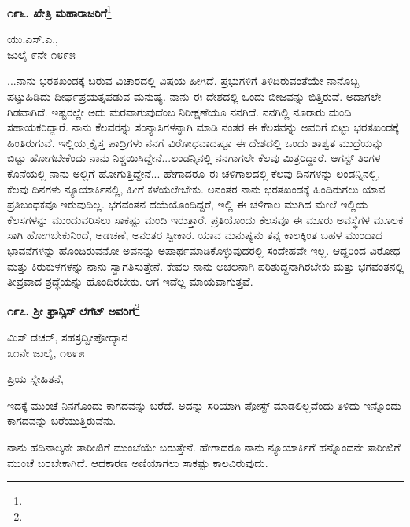\begin{center}
\textbf{೧೯೬. ಖೇತ್ರಿ ಮಹಾರಾಜರಿಗೆ}\footnote{}
\end{center}

\begin{flushright}
ಯು.ಎಸ್.ಎ.,\\ಜುಲೈ ೯ನೇ ೧೮೯೫
\end{flushright}

...ನಾನು ಭರತಖಂಡಕ್ಕೆ ಬರುವ ವಿಚಾರದಲ್ಲಿ ವಿಷಯ ಹೀಗಿದೆ. ಪ್ರಭುಗಳಿಗೆ ತಿಳಿದಿರುವಂತೆಯೇ ನಾನೊಬ್ಬ ಪಟ್ಟುಹಿಡಿದು ದೀರ್ಘಪ್ರಯತ್ನಪಡುವ ಮನುಷ್ಯ. ನಾನು ಈ ದೇಶದಲ್ಲಿ ಒಂದು ಬೀಜವನ್ನು ಬಿತ್ತಿರುವೆ. ಅದಾಗಲೇ ಗಿಡವಾಗಿದೆ. ಇಷ್ಟರಲ್ಲೇ ಅದು ಮರವಾಗುವುದೆಂಬ ನಿರೀಕ್ಷಣೆಯೂ ನನಗಿದೆ. ನನಗಿಲ್ಲಿ ನೂರಾರು ಮಂದಿ ಸಹಾಯಕರಿದ್ದಾರೆ. ನಾನು ಕೆಲವರನ್ನು ಸಂನ್ಯಾಸಿಗಳನ್ನಾಗಿ ಮಾಡಿ ನಂತರ ಈ ಕೆಲಸವನ್ನು ಅವರಿಗೆ ಬಿಟ್ಟು ಭರತಖಂಡಕ್ಕೆ ಹಿಂತಿರುಗುವೆ. ಇಲ್ಲಿಯ ಕ್ರೈಸ್ತ ಪಾದ್ರಿಗಳು ನನಗೆ ವಿರೋಧವಾದಷ್ಟೂ ಈ ದೇಶದಲ್ಲಿ ಒಂದು ಶಾಶ್ವತ ಮುದ್ರೆಯನ್ನು ಬಿಟ್ಟು ಹೋಗಬೇಕೆಂದು ನಾನು ನಿಶ್ಚಯಿಸಿದ್ದೇನೆ...ಲಂಡನ್ನಿನಲ್ಲಿ ನನಗಾಗಲೇ ಕೆಲವು ಮಿತ್ರರಿದ್ದಾರೆ. ಆಗಸ್ಟ್ ತಿಂಗಳ ಕೊನೆಯಲ್ಲಿ ನಾನು ಅಲ್ಲಿಗೆ ಹೋಗುತ್ತಿದ್ದೇನೆ... ಹೇಗಾದರೂ ಈ ಚಳಿಗಾಲದಲ್ಲಿ ಕೆಲವು ದಿನಗಳನ್ನು ಲಂಡನ್ನಿನಲ್ಲಿ, ಕೆಲವು ದಿನಗಳು ನ್ಯೂಯಾರ್ಕಿನಲ್ಲಿ, ಹೀಗೆ ಕಳೆಯಲೇಬೇಕು. ಅನಂತರ ನಾನು ಭರತಖಂಡಕ್ಕೆ ಹಿಂದಿರುಗಲು ಯಾವ ಪ್ರತಿಬಂಧಕವೂ ಇರುವುದಿಲ್ಲ. ಭಗವಂತನ ದಯೆಯೊಂದಿದ್ದರೆ, ಇಲ್ಲಿ ಈ ಚಳಿಗಾಲ ಮುಗಿದ ಮೇಲೆ ಇಲ್ಲಿಯ ಕೆಲಸಗಳನ್ನು ಮುಂದುವರಿಸಲು ಸಾಕಷ್ಟು ಮಂದಿ ಇರುತ್ತಾರೆ. ಪ್ರತಿಯೊಂದು ಕೆಲಸವೂ ಈ ಮೂರು ಅವಸ್ಥೆಗಳ ಮೂಲಕ ಸಾಗಿ ಹೋಗಬೇಕು\enginline{-}ನಿಂದೆ, ಅಡಚಣೆ, ಅನಂತರ ಸ್ವೀಕಾರ. ಯಾವ ಮನುಷ್ಯನು ತನ್ನ ಕಾಲಕ್ಕಿಂತ ಬಹಳ ಮುಂದಾದ ಭಾವನೆಗಳನ್ನು ಹೊಂದಿರುವನೋ ಅವನನ್ನು ಅಪಾರ್ಥಮಾಡಿಕೊಳ್ಳುವುದರಲ್ಲಿ ಸಂದೇಹವೇ ಇಲ್ಲ. ಆದ್ದರಿಂದ ವಿರೋಧ ಮತ್ತು ಕಿರುಕುಳಗಳನ್ನು ನಾನು ಸ್ವಾಗತಿಸುತ್ತೇನೆ. ಕೇವಲ ನಾನು ಅಚಲನಾಗಿ ಪರಿಶುದ್ಧನಾಗಿರಬೇಕು ಮತ್ತು ಭಗವಂತನಲ್ಲಿ ತೀವ್ರವಾದ ಶ್ರದ್ಧೆಯನ್ನು ಹೊಂದಿರಬೇಕು. ಆಗ ಇವೆಲ್ಲ ಮಾಯವಾಗುತ್ತವೆ.

\begin{center}
\textbf{೧೯೭. ಶ‍್ರೀ ಫ್ರಾನ್ಸಿಸ್ ಲೆಗೆಟ್ ಅವರಿಗೆ}\footnote{}
\end{center}

\vspace{-0.5cm}

\begin{flushright}
 ಮಿಸ್ ಡಚರ್‌, ಸಹಸ್ರದ್ವೀಪೋದ್ಯಾನ\\೩೧ನೇ ಜುಲೈ, ೧೮೯೫
\end{flushright}
\vspace{-0.4cm}

\noindent
ಪ್ರಿಯ ಸ್ನೇಹಿತನೆ,

ಇದಕ್ಕೆ ಮುಂಚೆ ನಿನಗೊಂದು ಕಾಗದವನ್ನು ಬರೆದೆ. ಅದನ್ನು ಸರಿಯಾಗಿ ಪೋಸ್ಟ್ ಮಾಡಲಿಲ್ಲವೆಂದು ತಿಳಿದು ಇನ್ನೊಂದು ಕಾಗದವನ್ನು ಬರೆಯುತ್ತಿರುವೆನು.

ನಾನು ಹದಿನಾಲ್ಕನೇ ತಾರೀಖಿಗೆ ಮುಂಚೆಯೇ ಬರುತ್ತೇನೆ. ಹೇಗಾದರೂ ನಾನು ನ್ಯೂಯಾರ್ಕಿಗೆ ಹನ್ನೊಂದನೇ ತಾರೀಖಿಗೆ ಮುಂಚೆ ಬರಬೇಕಾಗಿದೆ. ಆದಕಾರಣ ಅಣಿಯಾಗಲು ಸಾಕಷ್ಟು ಕಾಲವಿರುವುದು.

